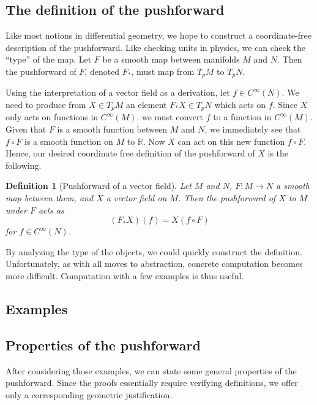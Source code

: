 \documentclass[12pt,letterpaper,boxed]{article}
\newtheorem{definition}[theorem]{Definition}
\newcommand{\R}{{\mathbb{R}}}
\begin{document}
\subsection{The definition of the pushforward}
Like most notions in differential geometry, we hope to construct a coordinate-free description of the pushforward. Like checking units in physics, we can check the ``type'' of the map. Let $F$ be a smooth map between manifolds $M$ and $N$. Then the pushforward of $F$, denoted $F_*$, must map from $T_p M$ to $T_p N$. 

Using the interpretation of a vector field as a derivation, let $f \in C^\infty(N)$. We need to produce from $X \in T_p M$ an element $F_* X \in T_p N$ which acts on $f$. Since $X$ only acts on functions in $C^\infty(M)$. we must convert $f$ to a function in $C^\infty(M)$. Given that $F$ is a smooth function between $M$ and $N$, we immediately see that $f \circ F$ is a smooth function on $M$ to $\R$. Now $X$ can act on this new function $f \circ F$. Hence, our desired coordinate free definition of the pushforward of $X$ is the following.

\begin{definition}[Pushforward of a vector field]
	Let $M$ and $N$, $F : M \to N$ a smooth map between them, and $X$ a vector field on $M$. Then the pushforward of $X$ to $M$ under $F$ acts as
	\[
		(F_* X)(f) = X(f \circ F)
	\]
	for $f \in C^\infty(N)$.
\end{definition}

By analyzing the type of the objects, we could quickly construct the definition. Unfortunately, as with all moves to abstraction, concrete computation becomes more difficult. Computation with a few examples is thus useful.

\subsection{Examples}
\subsection{Properties of the pushforward}
After considering those examples, we can state some general properties of the pushforward. Since the proofs essentially require verifying definitions, we offer only a corresponding geometric justification.
\end{document}
